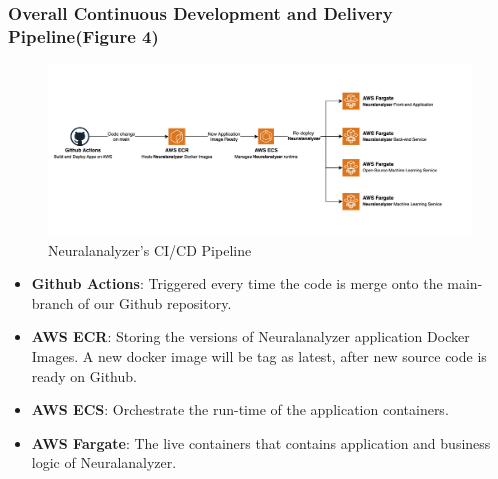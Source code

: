 \documentclass[12pt]{article}
\begin{document}
\subsubsection{Overall Continuous Development and Delivery Pipeline(Figure 4)}

\begin{figure}[h!]
  \centering
  \includegraphics[width=1\textwidth]{app-build-pipeline.png}
  \caption{Neuralanalyzer's CI/CD Pipeline}
  \label{fig:overall-ci-cd-infra}
\end{figure}

\begin{itemize}
    \item \textbf{Github Actions}: Triggered every time the code is merge onto the main-branch of our Github repository.
    \item \textbf{AWS ECR}: Storing the versions of Neuralanalyzer application Docker Images. A new docker image will be tag as latest, after new source code is ready on Github.
    \item \textbf{AWS ECS}: Orchestrate the run-time of the application containers.
    \item \textbf{AWS Fargate}: The live containers that contains application and business logic of Neuralanalyzer.
\end{itemize}
\end{document}
